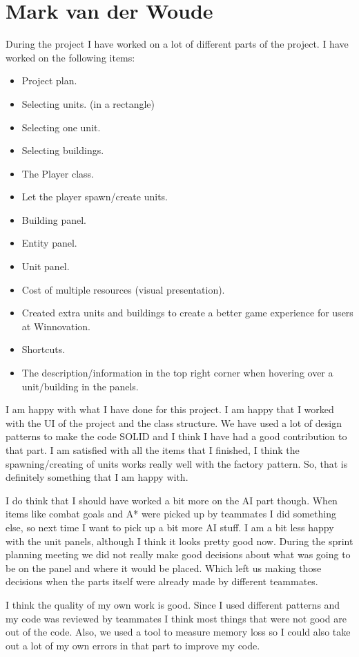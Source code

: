 \section{Mark van der Woude}

During the project I have worked on a lot of different parts of the project. I have worked on the following items:
\begin{itemize}
\item Project plan.
\item Selecting units. (in a rectangle)
\item Selecting one unit.
\item Selecting buildings.
\item The Player class.
\item Let the player spawn/create units.
\item Building panel.
\item Entity panel.
\item Unit panel.
\item Cost of multiple resources (visual presentation).
\item Created extra units and buildings to create a better game experience for users at Winnovation.
\item Shortcuts.
\item The description/information in the top right corner when hovering over a unit/building in the panels.
\end{itemize}

I am happy with what I have done for this project. I am happy that I worked with the UI of the project and the class structure. We have used a lot of design patterns to make the code SOLID and I think I have had a good contribution to that part. I am satisfied with all the items that I finished, I think the spawning/creating of units works really well with the factory pattern. So, that is definitely something that I am happy with. 

I do think that I should have worked a bit more on the AI part though. When items like combat goals and A* were picked up by teammates I did something else, so next time I want to pick up a bit more AI stuff. I am a bit less happy with the unit panels, although I think it looks pretty good now. During the sprint planning meeting we did not really make good decisions about what was going to be on the panel and where it would be placed. Which left us making those decisions when the parts itself were already made by different teammates.

I think the quality of my own work is good. Since I used different patterns and my code was reviewed by teammates I think most things that were not good are out of the code. Also, we used a tool to measure memory loss so I could also take out a lot of my own errors in that part to improve my code.

